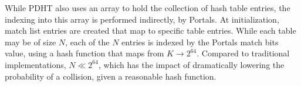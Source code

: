 While PDHT also uses an array to hold the collection of hash table entries, the
indexing into this array is performed indirectly, by Portals. At
initialization, match list entries are created that map to specific table
entries. While each table may be of size $N$, each of the $N$ entries is
indexed by the Portals match bits value, using a hash function that maps from
$K \rightarrow 2^{64}$. Compared to traditional implementations, $N \ll
2^{64}$, which has the impact of dramatically lowering the probability of a
collision, given a reasonable hash function.








